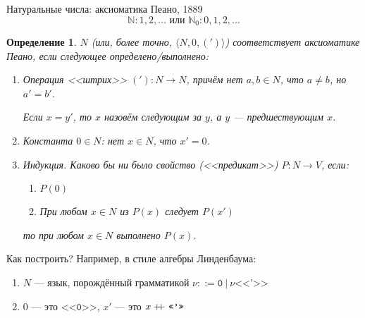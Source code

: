 \documentclass[aspectratio=169]{beamer}
\newtheorem{dfn}{Определение}[section]
\newcommand\doubleplus{+\kern-1.3ex+\kern0.8ex}
\begin{document}
\begin{frame}{Натуральные числа: аксиоматика Пеано, 1889}\vspace{-0.5cm}
 $$\mathbb{N}: 1, 2, \dots \mbox{ или } \mathbb{N}_0: 0, 1, 2, \dots$$\vspace{-1cm}\pause
\begin{dfn}
  $N$ (или, более точно, $\langle N, 0, (')\rangle$) \emph{соответствует} аксиоматике Пеано, 
  если следующее определено/выполнено:\pause
  \begin{enumerate}
     \item Операция <<штрих>> $('): N \to N$, причём нет $a,b \in N$, что $a \ne b$, но $a' = b'$.\pause
           
           Если $x = y'$, то $x$ назовём следующим за $y$, а $y$ --- предшествующим $x$.\pause
     \item Константа $0 \in N$: нет $x \in N$, что $x' = 0$.\pause
     \item Индукция. Каково бы ни было свойство (<<предикат>>) $P: N \to V$, если:
           \begin{enumerate}
           \item $P(0)$
           \item При любом $x\in N$ из $P(x)$ следует $P(x')$
           \end{enumerate}
           то при любом $x \in N$ выполнено $P(x)$.
  \end{enumerate}
\end{dfn}\pause
Как построить? Например, в стиле алгебры Линденбаума:\pause
\begin{enumerate}
\item $N$ --- язык, порождённый грамматикой $\nu ::= \texttt{0}\ |\ \nu \texttt{<<'>>}$\pause
\item $0$ --- это $\texttt{<<0>>}$, $x'$ --- это $x \doubleplus \texttt{<<'>>}$
\end{enumerate}
\end{frame}
\end{document}
